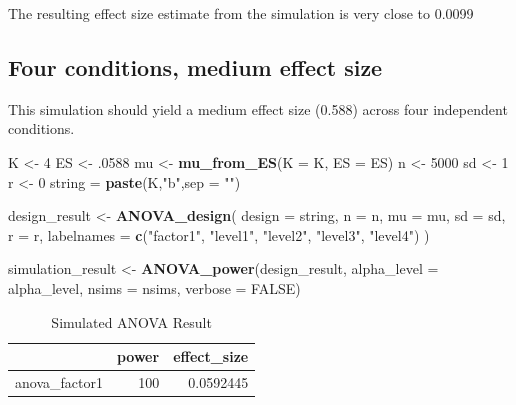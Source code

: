 \documentclass[]{book}
\newenvironment{Shaded}{\begin{snugshade}}{\end{snugshade}}
\newcommand{\DataTypeTok}[1]{\textcolor[rgb]{0.13,0.29,0.53}{#1}}
\newcommand{\DecValTok}[1]{\textcolor[rgb]{0.00,0.00,0.81}{#1}}
\newcommand{\FloatTok}[1]{\textcolor[rgb]{0.00,0.00,0.81}{#1}}
\newcommand{\KeywordTok}[1]{\textcolor[rgb]{0.13,0.29,0.53}{\textbf{#1}}}
\newcommand{\NormalTok}[1]{#1}
\newcommand{\OtherTok}[1]{\textcolor[rgb]{0.56,0.35,0.01}{#1}}
\newcommand{\StringTok}[1]{\textcolor[rgb]{0.31,0.60,0.02}{#1}}
\begin{document}
The resulting effect size estimate from the simulation is very close to 0.0099

\hypertarget{four-conditions-medium-effect-size}{%
\subsection{Four conditions, medium effect size}\label{four-conditions-medium-effect-size}}

This simulation should yield a medium effect size (0.588) across four independent conditions.

\begin{Shaded}
\begin{Highlighting}[]
\NormalTok{K <-}\StringTok{ }\DecValTok{4}
\NormalTok{ES <-}\StringTok{ }\FloatTok{.0588}
\NormalTok{mu <-}\StringTok{ }\KeywordTok{mu_from_ES}\NormalTok{(}\DataTypeTok{K =}\NormalTok{ K, }\DataTypeTok{ES =}\NormalTok{ ES)}
\NormalTok{n <-}\StringTok{ }\DecValTok{5000}
\NormalTok{sd <-}\StringTok{ }\DecValTok{1}
\NormalTok{r <-}\StringTok{ }\DecValTok{0}
\NormalTok{string =}\StringTok{ }\KeywordTok{paste}\NormalTok{(K,}\StringTok{"b"}\NormalTok{,}\DataTypeTok{sep =} \StringTok{""}\NormalTok{)}
\end{Highlighting}
\end{Shaded}

\begin{Shaded}
\begin{Highlighting}[]
\NormalTok{design_result <-}\StringTok{ }\KeywordTok{ANOVA_design}\NormalTok{(}
  \DataTypeTok{design =}\NormalTok{ string,}
  \DataTypeTok{n =}\NormalTok{ n,}
  \DataTypeTok{mu =}\NormalTok{ mu,}
  \DataTypeTok{sd =}\NormalTok{ sd,}
  \DataTypeTok{r =}\NormalTok{ r,}
  \DataTypeTok{labelnames =} \KeywordTok{c}\NormalTok{(}\StringTok{"factor1"}\NormalTok{, }\StringTok{"level1"}\NormalTok{, }\StringTok{"level2"}\NormalTok{, }\StringTok{"level3"}\NormalTok{, }\StringTok{"level4"}\NormalTok{)}
\NormalTok{  )}

\NormalTok{simulation_result <-}\StringTok{ }\KeywordTok{ANOVA_power}\NormalTok{(design_result, }
                                 \DataTypeTok{alpha_level =}\NormalTok{ alpha_level, }
                                 \DataTypeTok{nsims =}\NormalTok{ nsims,}
                                 \DataTypeTok{verbose =} \OtherTok{FALSE}\NormalTok{)}
\end{Highlighting}
\end{Shaded}

\begin{table}[t]

\caption{\label{tab:unnamed-chunk-64}Simulated ANOVA Result}
\centering
\begin{tabular}{l|r|r}
\hline
  & power & effect\_size\\
\hline
anova\_factor1 & 100 & 0.0592445\\
\hline
\end{tabular}
\end{table}
\end{document}
